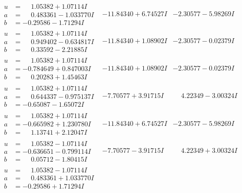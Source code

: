 \documentclass[1p]{elsarticle_modified}
\theoremstyle{definition}
\begin{document}
$$\begin{array}{c|c|c}
\begin{aligned}
u &= \phantom{-}1.05382 + 1.07114 I \\
a &= \phantom{-}0.483361 - 1.033770 I \\
b &= -0.29586 - 1.71294 I\end{aligned}
 & -11.84340 + 6.74527 I & -2.30577 - 5.98269 I \\ \hline\begin{aligned}
u &= \phantom{-}1.05382 + 1.07114 I \\
a &= \phantom{-}0.949402 - 0.634817 I \\
b &= \phantom{-}0.33592 - 2.21885 I\end{aligned}
 & -11.84340 + 1.08902 I & -2.30577 - 0.02379 I \\ \hline\begin{aligned}
u &= \phantom{-}1.05382 + 1.07114 I \\
a &= -0.784649 + 0.847003 I \\
b &= \phantom{-}0.20283 + 1.45463 I\end{aligned}
 & -11.84340 + 1.08902 I & -2.30577 - 0.02379 I \\ \hline\begin{aligned}
u &= \phantom{-}1.05382 + 1.07114 I \\
a &= \phantom{-}0.644337 - 0.975137 I \\
b &= -0.65087 - 1.65072 I\end{aligned}
 & -7.70577 + 3.91715 I & \phantom{-}4.22349 - 3.00324 I \\ \hline\begin{aligned}
u &= \phantom{-}1.05382 + 1.07114 I \\
a &= -0.665982 + 1.230780 I \\
b &= \phantom{-}1.13741 + 2.12047 I\end{aligned}
 & -11.84340 + 6.74527 I & -2.30577 - 5.98269 I \\ \hline\begin{aligned}
u &= \phantom{-}1.05382 - 1.07114 I \\
a &= -0.636651 - 0.799114 I \\
b &= \phantom{-}0.05712 - 1.80415 I\end{aligned}
 & -7.70577 - 3.91715 I & \phantom{-}4.22349 + 3.00324 I \\ \hline\begin{aligned}
u &= \phantom{-}1.05382 - 1.07114 I \\
a &= \phantom{-}0.483361 + 1.033770 I \\
b &= -0.29586 + 1.71294 I\end{aligned}

\end{array}$$
\end{document}
